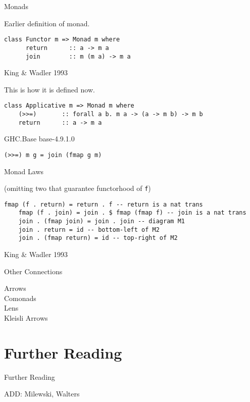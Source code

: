 \documentclass[10pt]{beamer}
\theoremstyle{definition}
\theoremstyle{remark}
\numberwithin{equation}{section}
\begin{document}
\begin{frame}[fragile]{Monads}

  Earlier definition of monad.
  
  \begin{lstlisting}[frame=single]
    class Functor m => Monad m where
      return      :: a -> m a
      join        :: m (m a) -> m a
  \end{lstlisting}

  {\small King \& Wadler 1993}

  This is how it is defined now.
  
  \begin{lstlisting}[frame=single]
    class Applicative m => Monad m where
    (>>=)       :: forall a b. m a -> (a -> m b) -> m b
    return      :: a -> m a
  \end{lstlisting}

  {\small GHC.Base base-4.9.1.0}

  \begin{lstlisting}[frame=single]
    (>>=) m g = join (fmap g m)
  \end{lstlisting}

\end{frame}

\begin{frame}[fragile]{Monad Laws}

  (omitting two that guarantee functorhood of \lstinline{f})
  
  \begin{lstlisting}[frame=single]
    fmap (f . return) = return . f -- return is a nat trans
    fmap (f . join) = join . $ fmap (fmap f) -- join is a nat trans
    join . (fmap join) = join . join -- diagram M1
    join . return = id -- bottom-left of M2
    join . (fmap return) = id -- top-right of M2
  \end{lstlisting}

  {\small King \& Wadler 1993}
  
\end{frame}

\begin{frame}[fragile]{Other Connections}
  \begin{description}
  \item[Arrows] 
  \item[Comonads] 
  \item[Lens] 
  \item[Kleisli Arrows] 
  \end{description}
\end{frame}

\section{Further Reading}

\begin{frame}[fragile]{Further Reading}

  ADD: Milewski, Walters
  
  \nocite{elkins_calculating_2009}
  \nocite{diel:_blog}
  
  

\end{frame}
\end{document}
